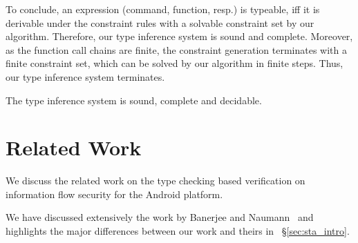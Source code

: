 {{{To conclude, an expression (command, function, resp.) is typeable, iff it is derivable under the constraint rules with a solvable constraint set by our algorithm.
Therefore, our type inference system is sound and complete.
Moreover, as the function call chains are finite, the constraint generation terminates with a finite constraint set, which can be solved by our algorithm in finite steps.
Thus, our type inference system terminates.

\begin{theorem}
The type inference system is sound, complete and decidable.
\end{theorem}


\section{Related Work}

We discuss the related work on the type checking based verification on information flow security for the Android platform.

We have discussed extensively the work by Banerjee and Naumann~\cite{Banerjee:2005ht} and highlights the major differences between our work and theirs in ~\S\ref{sec:sta_intro}.


}}}
